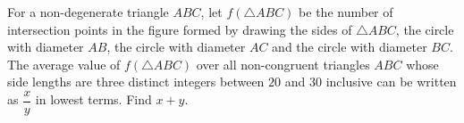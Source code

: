 For a non-degenerate triangle $ABC$, let $f(\triangle ABC)$ be the number of intersection points in the figure formed by drawing the sides of $\triangle ABC$, the circle with diameter $AB$, the circle with diameter $AC$ and the circle with diameter $BC$. The average value of $f(\triangle ABC)$ over all non-congruent triangles $ABC$ whose side lengths are three distinct integers between $20$ and $30$ inclusive can be written as $\dfrac xy$ in lowest terms. Find $x+y$.
